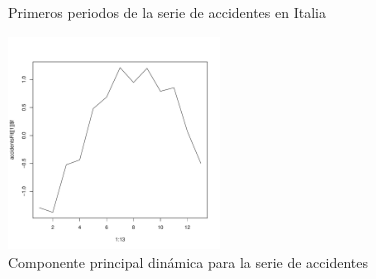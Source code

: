 \begin{figure}[]
 \centering
 \caption{Primeros periodos de la serie de accidentes en Italia}
 \label{f:periodos}
\end{figure}

\begin{figure}[]
 \centering
 \includegraphics[width=0.5\textwidth]{../imagenes/accidentsComp.pdf}
 \caption{Componente principal dinámica para la serie de accidentes}
 \label{f:accidentsComp}
\end{figure}

